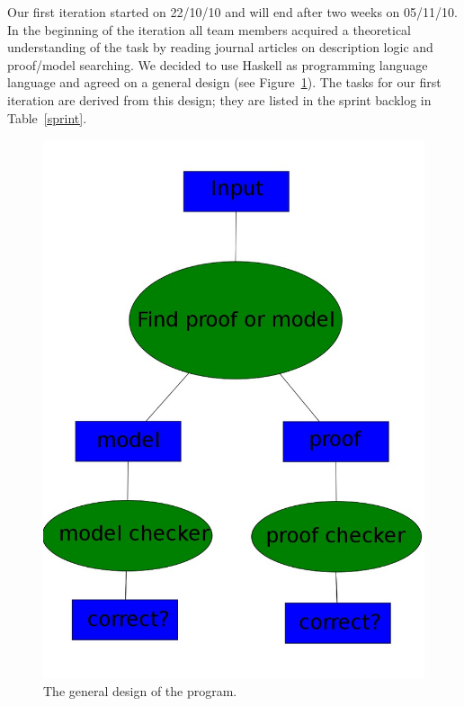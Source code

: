 
Our first iteration started on 22/10/10 and will end after two weeks on 05/11/10.
In the beginning of the iteration all team members acquired a theoretical understanding
of the task by reading journal articles on description logic and proof/model searching.
We decided to use Haskell as programming language language and agreed on a general
design (see Figure~\ref{design}). The tasks for our first iteration are derived from
this design; they are listed in the sprint backlog in Table~\ref{sprint}.

\begin{figure}
  \caption{The general design of the program.}
  \begin{center}
    \includegraphics[scale=0.4]{design.jpeg}
  \end{center}
  \label{design}
\end{figure}

